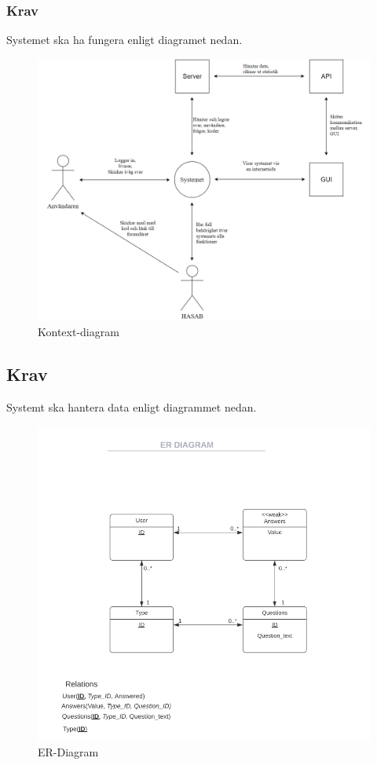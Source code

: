 \documentclass{article}
\begin{document}
    \subsubsection{Krav}
    Systemet ska ha fungera enligt diagramet nedan.
    
    \begin{figure}[h!]
    \includegraphics[width=150mm]{Kontextdiagram.png}
    \caption{Kontext-diagram}
    \end{figure}
    
    \newpage
    \subsection{Krav}
    Systemt ska hantera data enligt diagrammet nedan.
       \begin{figure}[h!]
    
    \includegraphics[width=150mm]{ERDIAGRAM.png}
    \caption{ER-Diagram}
    \end{figure}
    
\end{document}
